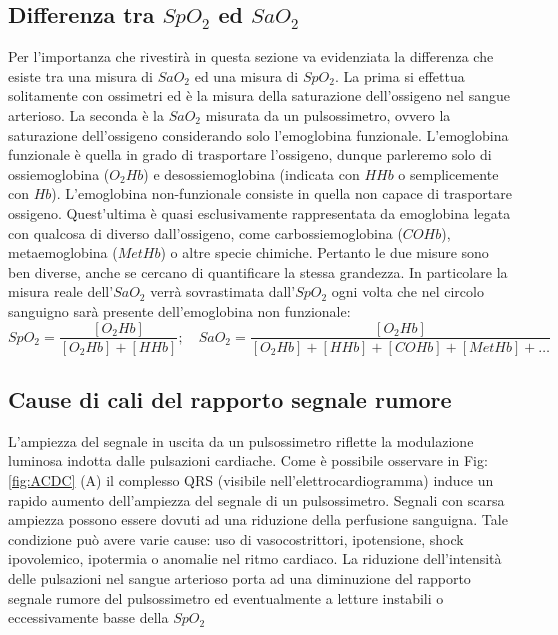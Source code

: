 \documentclass[12pt,a4paper, twoside, openright]{report}
\begin{document}
\subsection{Differenza tra \texorpdfstring{$SpO_2$}{SpO_2} ed \texorpdfstring{$SaO_2$}{SaO_2}}

Per l'importanza che rivestirà in questa sezione va evidenziata la differenza che esiste tra una misura di $SaO_2$ ed una misura di $SpO_2$.
La prima si effettua solitamente con ossimetri ed è la misura della saturazione dell'ossigeno nel sangue arterioso.
La seconda è la $SaO_2$ misurata da un pulsossimetro, ovvero la saturazione dell'ossigeno considerando solo l'emoglobina funzionale.
L'emoglobina funzionale è quella in grado di trasportare l'ossigeno, dunque parleremo solo di ossiemoglobina ($O_2Hb$) e desossiemoglobina (indicata con $HHb$ o semplicemente con $Hb$).
L'emoglobina non-funzionale consiste in quella non capace di trasportare ossigeno.
Quest'ultima è quasi esclusivamente rappresentata da emoglobina legata con qualcosa di diverso dall'ossigeno, come carbossiemoglobina ($COHb$), metaemoglobina ($MetHb$) o altre specie chimiche.
Pertanto le due misure sono ben diverse, anche se cercano di quantificare la stessa grandezza.
In particolare la misura reale dell'$SaO_2$ verrà sovrastimata dall'$SpO_2$ ogni volta che nel circolo sanguigno sarà presente dell'emoglobina non funzionale:
\begin{equation}
	SpO_2 = \frac{[O_2Hb]}{[O_2Hb]+[HHb]}; \quad SaO_2 = \frac{[O_2Hb]}{[O_2Hb]+[HHb]+			[COHb]+[MetHb]+\ldots}
\end{equation}


\subsection{Cause di cali del rapporto segnale rumore}

L'ampiezza del segnale in uscita da un pulsossimetro riflette la modulazione luminosa indotta dalle pulsazioni cardiache. 
Come è possibile osservare in Fig:\ref{fig:ACDC} (A) il complesso QRS (visibile nell'elettrocardiogramma) induce un rapido aumento dell'ampiezza del segnale di un pulsossimetro. 
Segnali con scarsa ampiezza possono essere dovuti ad una riduzione della perfusione sanguigna. Tale condizione può avere varie cause: uso di vasocostrittori, ipotensione, shock ipovolemico, ipotermia o anomalie nel ritmo cardiaco. 
La riduzione dell'intensità delle pulsazioni nel sangue arterioso porta ad una diminuzione del rapporto segnale rumore del pulsossimetro ed eventualmente a letture instabili o eccessivamente basse della $SpO_2$
\end{document}
